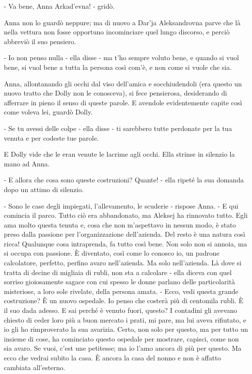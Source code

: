 - Va bene, Anna Arkad'evna! - gridò. 

Anna non lo guardò neppure; ma di nuovo a Dar'ja Aleksandrovna parve che là nella vettura non fosse opportuno incominciare quel lungo discorso, e perciò abbreviò il suo pensiero. 

- Io non penso nulla - ella disse - ma t'ho sempre voluto bene, e quando si vuol bene, si vuol bene a tutta la persona così com'è, e non come si vuole che sia. 

Anna, allontanando gli occhi dal viso dell'amica e socchiudendoli (era questo un nuovo tratto che Dolly non le conosceva), si fece pensierosa, desiderando di afferrare in pieno il senso di queste parole. E avendole evidentemente capite così come voleva lei, guardò Dolly. 

- Se tu avessi delle colpe - ella disse - ti sarebbero tutte perdonate per la tua venuta e per codeste tue parole. 

E Dolly vide che le eran venute le lacrime agli occhi. Ella strinse in silenzio la mano ad Anna. 

- E allora che cosa sono queste costruzioni? Quante! - ella ripeté la sua domanda dopo un attimo di silenzio. 

- Sono le case degli impiegati, l'allevamento, le scuderie - rispose Anna. - E qui comincia il parco. Tutto ciò era abbandonato, ma Aleksej ha rinnovato tutto. Egli ama molto questa tenuta e, cosa che non m'aspettavo in nessun modo, è stato preso dalla passione per l'organizzazione dell'azienda. Del resto è una natura così ricca! Qualunque cosa intraprenda, fa tutto così bene. Non solo non si annoia, ma si occupa con passione. È diventato, così come lo conosco io, un padrone calcolatore, perfetto, perfino avaro nell'azienda. Ma solo nell'azienda. Là dove si tratta di decine di migliaia di rubli, non sta a calcolare - ella diceva con quel sorriso gioiosamente sagace con cui spesso le donne parlano delle particolarità misteriose, a loro sole rivelate, della persona amata. - Ecco, vedi questa grande costruzione? È un nuovo ospedale. Io penso che costerà più di centomila rubli. È il suo dada adesso. E sai perché è venuto fuori, questo? I contadini gli avevano chiesto di ceder loro più a buon mercato i prati, mi pare, ma lui aveva rifiutato, e io gli ho rimproverato la sua avarizia. Certo, non solo per questo, ma per tutto un insieme di cose, ha cominciato questo ospedale per mostrare, capisci, come non sia avaro. Se vuoi, c'est une petitesse; ma io l'amo ancora di più per questo. Ma ecco che vedrai subito la casa. È ancora la casa del nonno e non è affatto cambiata all'esterno. 

